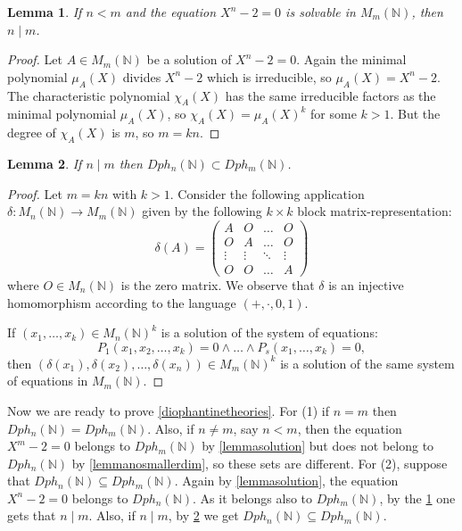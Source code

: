 \documentclass{article}
\theoremstyle{plain}
\newtheorem{lemma}{Lemma}[section]
\theoremstyle{definition}
\begin{document}
\begin{lemma}\label{lemmadivisibilnecessary}
If $n < m$ and the equation $X^n -2 = 0$ is solvable in $M_m(\mathbb N)$, then $n \mid m$. 
\end{lemma} 

\begin{proof}
Let $A \in M_m(\mathbb N)$ be a solution of $X^n -2 = 0$. Again the minimal polynomial $\mu_A(X)$ divides $X^n-2$ which is irreducible, so $\mu_A(X) = X^n-2$. The characteristic polynomial $\chi_A(X)$ has the same irreducible factors as the minimal polynomial $\mu_A(X)$, so $\chi_A(X) = \mu_A(X)^k$ for some $k > 1$. But the degree of $\chi_A(X)$ is $m$, so $m = kn$. 
\end{proof} 

\begin{lemma}\label{lemmadivisibilsufficient}
If $n \mid m$ then $Dph_n(\mathbb N) \subset Dph_m(\mathbb N)$. 
\end{lemma}

\begin{proof} Let $m = kn$ with $k> 1$. 
Consider the following application $\delta : M_n(\mathbb N) \rightarrow M_m(\mathbb N)$ given by the following $k \times k$ block matrix-representation: 
$$ \delta(A) = 
\begin{pmatrix}
A & O & \dots & O \\
O & A & \dots & O \\
\vdots & \vdots & \ddots & \vdots \\
O & O & \dots & A
\end{pmatrix}
$$
where $O \in M_n(\mathbb N)$ is the zero matrix. We observe that $\delta$ is an injective homomorphism according to the language $(+, \cdot, 0, 1)$. 

If $(x_1, \dots, x_k) \in M_n(\mathbb N)^k$ is a solution of the system of equations:
$$P_1(x_1, x_2, \dots, x_k) = 0 \wedge \dots \wedge P_s(x_1, \dots, x_k) = 0, $$
then $(\delta(x_1), \delta(x_2), \dots, \delta(x_n)) \in M_m(\mathbb N)^k$ is a solution of the same system of equations in $M_m(\mathbb N)$. 
\end{proof} 

Now we are ready to prove \cref{diophantinetheories}. For (1) if $n = m$ then $Dph_n (\mathbb N) = Dph_m(\mathbb N)$. Also, if $n \neq m$, say $n < m$, then the equation $X^m - 2 = 0$ belongs to $Dph_m(\mathbb N)$ by \cref{lemmasolution} but does not belong to $Dph_n (\mathbb N)$ by \cref{lemmanosmallerdim}, so these sets are different. For (2), suppose that $Dph_n(\mathbb N) \subseteq Dph_m(\mathbb N)$. Again by \cref{lemmasolution}, the equation $X^n -2 = 0$ belongs to $Dph_n(\mathbb N)$. As it belongs also to $Dph_m(\mathbb N)$, by the \cref{lemmadivisibilnecessary} one gets that $n \mid m$. Also, if $n \mid m$, by \cref{lemmadivisibilsufficient} we get $Dph_n(\mathbb N) \subseteq Dph_m(\mathbb N)$.
\end{document}
